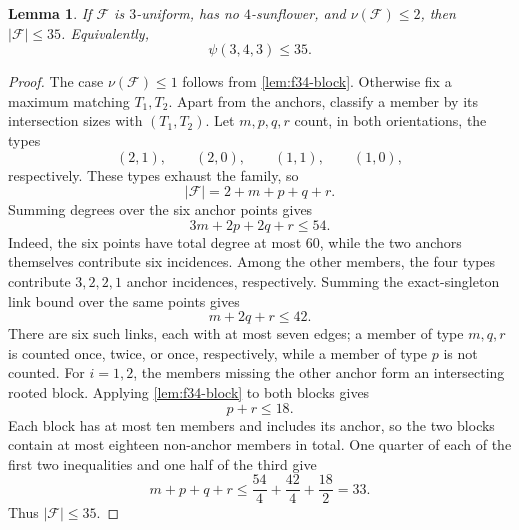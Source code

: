 \documentclass[11pt]{article}
\numberwithin{equation}{section}
\newtheorem{lemma}[lemma]{Lemma}
\theoremstyle{definition}
\theoremstyle{remark}
\newcommand{\F}{\mathcal F}
\begin{document}
\begin{lemma}
\label{lem:f34-nu2}
If $\F$ is $3$-uniform, has no $4$-sunflower, and $\nu(\F)\le2$, then
$|\F|\le35$. Equivalently,
\[
 \psi(3,4,3)\le35.
\]
\end{lemma}

\begin{proof}
The case $\nu(\F)\le1$ follows from \cref{lem:f34-block}. Otherwise fix a
maximum matching $T_1,T_2$. Apart from the anchors, classify a member by its
intersection sizes with $(T_1,T_2)$. Let $m,p,q,r$ count, in both
orientations, the types
\[
 (2,1),\qquad(2,0),\qquad(1,1),\qquad(1,0),
\]
respectively. These types exhaust the family, so
\[
 |\F|=2+m+p+q+r.
\]
Summing degrees over the six anchor points gives
\begin{equation}
 3m+2p+2q+r\le54.
 \label{eq:f34-nu2-degree}
\end{equation}
Indeed, the six points have total degree at most $60$, while the two anchors
themselves contribute six incidences. Among the other members, the four
types contribute $3,2,2,1$ anchor incidences, respectively.
Summing the exact-singleton link bound over the same points gives
\begin{equation}
 m+2q+r\le42.
 \label{eq:f34-nu2-links}
\end{equation}
There are six such links, each with at most seven edges; a member of type
$m,q,r$ is counted once, twice, or once, respectively, while a member of type
$p$ is not counted.
For $i=1,2$, the members missing the other anchor form an intersecting rooted
block. Applying \cref{lem:f34-block} to both blocks gives
\begin{equation}
 p+r\le18.
 \label{eq:f34-nu2-blocks}
\end{equation}
Each block has at most ten members and includes its anchor, so the two blocks
contain at most eighteen non-anchor members in total.
One quarter of each of the first two inequalities and one half of the third
give
\[
 m+p+q+r\le\frac{54}{4}+\frac{42}{4}+\frac{18}{2}=33.
\]
Thus $|\F|\le35$.
\end{proof}
\end{document}
